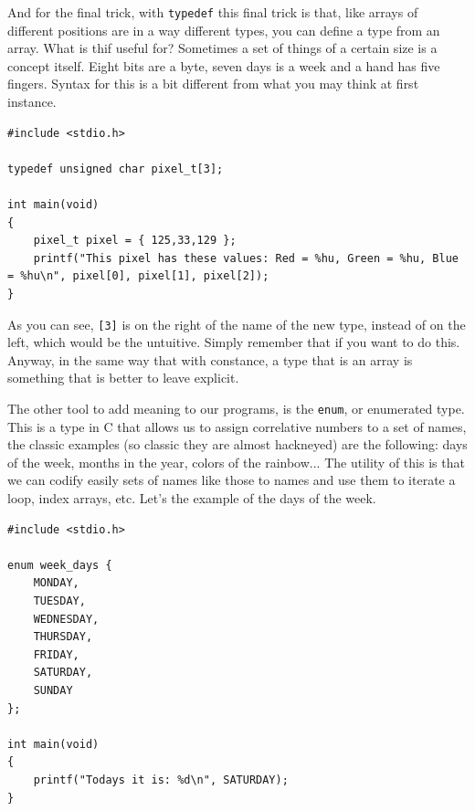\documentclass[a4paper]{article}
\begin{document}
And for the final trick, with \verb!typedef! this final trick is that, like arrays
of different positions are in a way different types, you can define a type from
an array. What is thif useful for? Sometimes a set of things of a certain size
is a concept itself. Eight bits are a byte, seven days is a week and a hand has
five fingers. Syntax for this is a bit different from what you may think at
first instance.

\noindent
\begin{minipage}[H]{\linewidth}
\mbox{}
\begin{lstlisting}[style=C,
caption={Definición de un tipo personalizado a partir de un array},
label={lst:typedefArrayType}]
#include <stdio.h>

typedef unsigned char pixel_t[3];

int main(void)
{
    pixel_t pixel = { 125,33,129 };
    printf("This pixel has these values: Red = %hu, Green = %hu, Blue = %hu\n", pixel[0], pixel[1], pixel[2]);
}
\end{lstlisting}
\end{minipage}

As you can see, \verb![3]! is on the right of the name of the new type, instead
of on the left, which would be the untuitive. Simply remember that
if you want to do this. Anyway, in the same way that with constance, a type
that is an array is something that is better to leave explicit.

The other tool to add meaning to our programs, is the \verb!enum!, or
enumerated type. This is a type in C that allows us to assign correlative
numbers to a set of names, the classic examples (so classic they are almost
hackneyed) are the following: days of the week, months in the year, colors of
the rainbow... The utility of this is that we can codify easily sets of names
like those to names and use them to iterate a loop, index arrays, etc. Let's the
example of the days of the week.

\noindent
\begin{minipage}[H]{\linewidth}
\mbox{}
\begin{lstlisting}[style=C,
caption={Basic example of enumerated type},
label={lst:BasicEnum}]
#include <stdio.h>

enum week_days {
    MONDAY,
    TUESDAY,
    WEDNESDAY,
    THURSDAY,
    FRIDAY,
    SATURDAY,
    SUNDAY
};

int main(void)
{
    printf("Todays it is: %d\n", SATURDAY);
}
\end{lstlisting}
\end{minipage}
\end{document}
